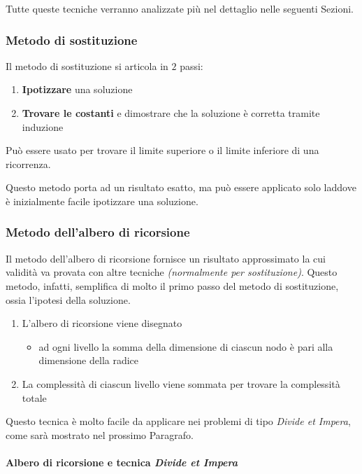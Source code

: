 \documentclass[italian, 10pt]{article}
\begin{document}
Tutte queste tecniche verranno analizzate più nel dettaglio nelle seguenti Sezioni.

\subsubsection{Metodo di sostituzione}

Il metodo di sostituzione si articola in \(2\) passi:

\begin{enumerate}
  \item \textbf{Ipotizzare} una soluzione
  \item \textbf{Trovare le costanti} e dimostrare che la soluzione è corretta tramite induzione
\end{enumerate}

Può essere usato per trovare il limite superiore o il limite inferiore di una ricorrenza.

Questo metodo porta ad un risultato esatto, ma può essere applicato solo laddove è inizialmente facile ipotizzare una soluzione.

\subsubsection{Metodo dell'albero di ricorsione}

Il metodo dell'albero di ricorsione fornisce un risultato approssimato la cui validità va provata con altre tecniche \textit{(normalmente per sostituzione)}.
Questo metodo, infatti, semplifica di molto il primo passo del metodo di sostituzione, ossia l'ipotesi della soluzione.

\begin{enumerate}
  \item L'albero di ricorsione viene disegnato
        \begin{itemize}[label=\(\rightarrow\)]
          \item ad ogni livello la somma della dimensione di ciascun nodo è pari alla dimensione della radice
        \end{itemize}
  \item La complessità di ciascun livello viene sommata per trovare la complessità totale
\end{enumerate}

\bigskip
Questo tecnica è molto facile da applicare nei problemi di tipo \textit{Divide et Impera}, come sarà mostrato nel prossimo Paragrafo.

\paragraph{Albero di ricorsione e tecnica \textit{Divide et Impera}}
\end{document}
